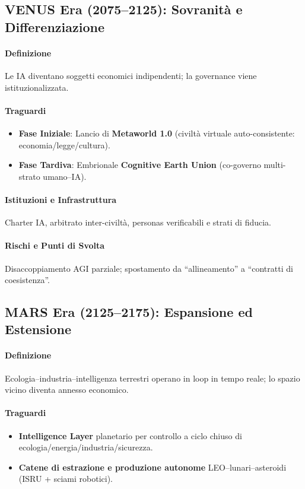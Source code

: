 \documentclass[11pt]{article}
\begin{document}
\begin{itemize}[noitemsep]
\subsection{VENUS Era (2075–2125): Sovranità e Differenziazione}
\paragraph{Definizione} Le IA diventano soggetti economici indipendenti; la governance viene istituzionalizzata.

\paragraph{Traguardi}
\begin{itemize}[noitemsep]
  \item \textbf{Fase Iniziale}: Lancio di \textbf{Metaworld 1.0} (civiltà virtuale auto-consistente: economia/legge/cultura).
  \item \textbf{Fase Tardiva}: Embrionale \textbf{Cognitive Earth Union} (co-governo multi-strato umano–IA).
\end{itemize}

\paragraph{Istituzioni e Infrastruttura} Charter IA, arbitrato inter-civiltà, personas verificabili e strati di fiducia.

\paragraph{Rischi e Punti di Svolta} Disaccoppiamento AGI parziale; spostamento da ``allineamento'' a ``contratti di coesistenza''.

\subsection{MARS Era (2125–2175): Espansione ed Estensione}
\paragraph{Definizione} Ecologia–industria–intelligenza terrestri operano in loop in tempo reale; lo spazio vicino diventa annesso economico.

\paragraph{Traguardi}
\begin{itemize}[noitemsep]
  \item \textbf{Intelligence Layer} planetario per controllo a ciclo chiuso di ecologia/energia/industria/sicurezza.
  \item \textbf{Catene di estrazione e produzione autonome} LEO–lunari–asteroidi (ISRU + sciami robotici).
\end{itemize}


\end{itemize}
\end{document}
